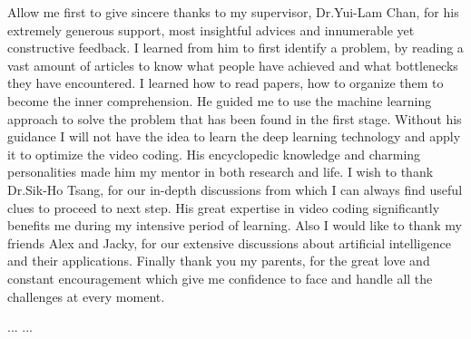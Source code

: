 \documentclass{report}
\begin{document}
    Allow me first to give sincere thanks to my supervisor,
    Dr.Yui-Lam Chan, for his
    extremely generous support, most insightful advices and innumerable yet
    constructive feedback.
    I learned from him to first identify a problem,
    by reading a vast amount of articles
    to know what people have achieved and what bottlenecks they have encountered.
    I learned how to read papers, how to organize them to
    become the inner comprehension.
    He guided me to use the machine learning approach to solve the
    problem that has been found in the first stage.
    Without his guidance I will not have the idea to learn the deep
    learning technology and apply it to optimize the video coding.
    His encyclopedic knowledge and charming personalities made him my mentor in
    both research and life.
    I wish to thank Dr.Sik-Ho Tsang, for our in-depth discussions from
    which I can always find useful clues to proceed to next step.
    His great expertise in video coding significantly benefits me during my
    intensive period of learning.
    Also I would like to thank my friends Alex
    and Jacky, for our
    extensive discussions about artificial intelligence
    and their applications.
    Finally thank you my parents, for the great love and constant
    encouragement which give me confidence to face and handle all the
    challenges at every moment.
    \afterpreface

    
    
    ...
    ...
    \printbibliography[heading=bibintoc]
\end{document}
